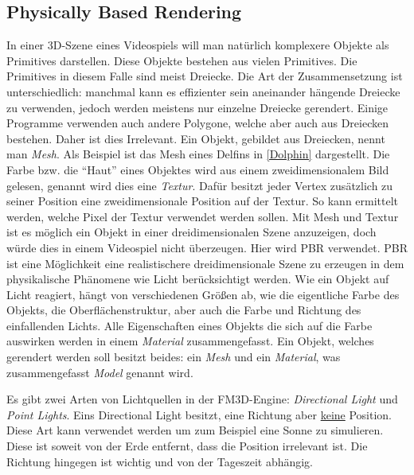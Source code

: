 \subsection{Physically Based Rendering}

In einer 3D-Szene eines Videospiels will man natürlich komplexere Objekte als Primitives darstellen. Diese Objekte bestehen aus vielen Primitives. Die Primitives in diesem Falle sind meist Dreiecke. 
Die Art der Zusammensetzung ist unterschiedlich: manchmal kann es effizienter sein aneinander hängende Dreiecke zu verwenden, jedoch werden meistens nur einzelne Dreiecke gerendert. 
Einige Programme verwenden auch andere Polygone, welche aber auch aus Dreiecken bestehen. Daher ist dies Irrelevant. 
Ein Objekt, gebildet aus Dreiecken, nennt man \textit{Mesh}. Als Beispiel ist das Mesh eines Delfins in \cref{Dolphin} dargestellt. Die Farbe bzw. die "`Haut"' eines Objektes wird aus einem zweidimensionalem Bild gelesen, genannt wird dies eine \textit{Textur}. 
Dafür besitzt jeder Vertex zusätzlich zu seiner Position eine zweidimensionale Position auf der Textur. So kann ermittelt werden, welche Pixel der Textur verwendet werden sollen.
Mit Mesh und Textur ist es möglich ein Objekt in einer dreidimensionalen Szene anzuzeigen, doch würde dies in einem Videospiel nicht überzeugen. Hier wird \ac{PBR} verwendet. \ac{PBR} ist eine Möglichkeit eine realistischere dreidimensionale Szene zu erzeugen in dem physikalische Phänomene wie Licht berücksichtigt werden. 
Wie ein Objekt auf Licht reagiert, hängt von verschiedenen Größen ab, wie die eigentliche Farbe des Objekts, die Oberflächenstruktur, aber auch die Farbe und Richtung des einfallenden Lichts. Alle Eigenschaften eines Objekts die sich auf die Farbe auswirken werden in einem \textit{Material} zusammengefasst. 
Ein Objekt, welches gerendert werden soll besitzt beides: ein \textit{Mesh} und ein \textit{Material}, was zusammengefasst \textit{Model} genannt wird.

Es gibt zwei Arten von Lichtquellen in der FM3D-Engine: \textit{Directional Light} und \textit{Point Lights}. Eins Directional Light besitzt, eine Richtung aber \underline{keine} Position. Diese Art kann verwendet werden um zum Beispiel eine Sonne zu simulieren. Diese ist soweit von der Erde entfernt, dass die Position irrelevant ist. Die Richtung hingegen ist wichtig und von der Tageszeit abhängig. 


